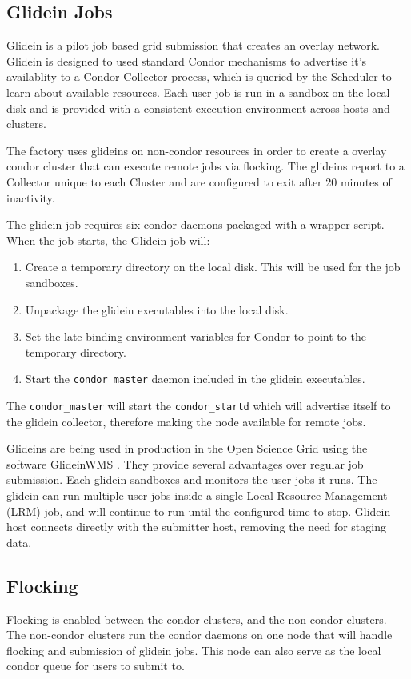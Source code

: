 \documentclass[11pt]{article}
\begin{document}
\subsection{Glidein Jobs}
Glidein  \cite{frey2002condor} is a pilot job based grid submission that creates an overlay network.  Glidein is designed to used standard Condor mechanisms to advertise it's availablity to a Condor Collector process, which is queried by the Scheduler to learn about available resources.  Each user job is run in a sandbox on the local disk and is provided with a consistent execution environment across hosts and clusters.  

The factory uses glideins on non-condor resources in order to create a overlay condor cluster that can execute remote jobs via flocking.  The glideins report to a Collector unique to each Cluster and are configured to exit after 20 minutes of inactivity.  

The glidein job requires six condor daemons packaged with a wrapper script.  When the job starts, the Glidein job will:

\begin{enumerate}
\item Create a temporary directory on the local disk.  This will be used for the job sandboxes.
\item Unpackage the glidein executables into the local disk.
\item Set the late binding environment variables for Condor to point to the temporary directory.
\item Start the  \texttt{condor\_master} daemon included in the glidein executables.
\end{enumerate}

The \texttt{condor\_master} will start the \texttt{condor\_startd} which will advertise itself to the glidein collector, therefore making the node available for remote jobs.  

Glideins are being used in production in the Open Science Grid using the software GlideinWMS \cite{sfiligoi2008glideinwms}.  They provide several advantages over regular job submission.  Each glidein sandboxes and monitors the user jobs it runs.  The glidein can run multiple user jobs inside a single Local Resource Management (LRM) job, and will continue to run until the configured time to stop.  Glidein host connects directly with the submitter host, removing the need for staging data.

\subsection{Flocking}
Flocking is enabled between the condor clusters, and the non-condor clusters.  The non-condor clusters run the condor daemons on one node that will handle flocking and submission of glidein jobs.  This node can also serve as the local condor queue for users to submit to. 
\end{document}

